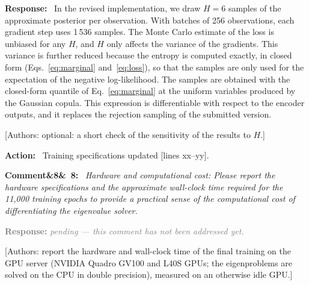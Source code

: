 \documentclass[11pt]{article}
\newenvironment{rcomment}[1]{\par\bigskip\noindent\textbf{Comment\ifx&#1&\else\ #1\fi:}\ \itshape}{\par}
\newenvironment{response}{\par\smallskip\noindent\color{resp}\textbf{Response:}\ }{\par}
\newenvironment{action}{\par\smallskip\noindent\color{resp}\textbf{Action:}\ }{\par}
\newcommand{\pending}{\par\smallskip\noindent\textcolor{gray}{\textbf{Response:} \textit{pending --- this comment
has not been addressed yet.}}\par}
\newcommand{\authornote}[1]{\textcolor{note}{\textsf{[Authors: #1]}}}
\newcommand{\tbd}[1]{\textcolor{note}{\textsf{[#1]}}}
\newcommand{\lines}[1]{\tbd{lines #1}}
\begin{document}
\begin{response}
In the revised implementation, we draw $H=6$ samples of the approximate posterior per observation. With batches of 256
observations, each gradient step uses 1\,536 samples. The Monte Carlo estimate of the loss is unbiased for any $H$, and
$H$ only affects the variance of the gradients. This variance is further reduced because the entropy is computed
exactly, in closed form (Eqs.~\eqref{eq:marginal} and~\eqref{eq:loss}), so that the samples are only used for the
expectation of the negative log-likelihood. The samples are obtained with the closed-form quantile of
Eq.~\eqref{eq:marginal} at the uniform variables produced by the Gaussian copula. This expression is differentiable with
respect to the encoder outputs, and it replaces the rejection sampling of the submitted version.
\end{response}
\authornote{optional: a short check of the sensitivity of the results to $H$.}

\begin{action}
Training specifications updated \lines{xx--yy}.
\end{action}

\begin{rcomment}{8}
Hardware and computational cost: Please report the hardware specifications and the approximate wall-clock time
required for the 11,000 training epochs to provide a practical sense of the computational cost of differentiating the
eigenvalue solver.
\end{rcomment}
\pending
\authornote{report the hardware and wall-clock time of the final training on the GPU server (NVIDIA Quadro GV100 and L40S GPUs; the eigenproblems are solved on the CPU in double precision), measured on an otherwise idle GPU.}

\end{document}
